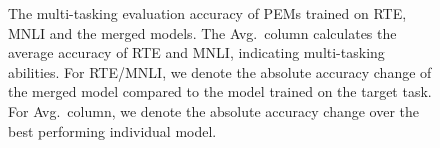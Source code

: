 
\begin{figure}[!t]
\begin{minipage}{0.6\textwidth}
\begin{table}[H]
\caption{The multi-tasking evaluation accuracy of PEMs trained on RTE, MNLI and the merged models. 
The Avg.~column calculates the average accuracy of RTE and MNLI, indicating multi-tasking abilities.
For RTE/MNLI, we denote the absolute accuracy change of the merged model compared to the model trained on the target task. For Avg.~column, we denote the absolute accuracy change over the best performing individual model. 
} %
\label{table:multitask}
\vspace{3mm}
\centering
{}
\end{table}
\end{minipage}
\end{figure}
